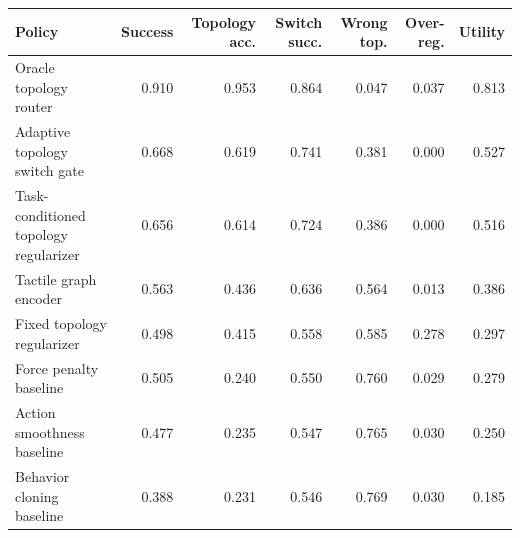 \begin{tabular}{lrrrrrr}
\toprule
Policy & Success & Topology acc. & Switch succ. & Wrong top. & Over-reg. & Utility \\
\midrule
Oracle topology router & 0.910 & 0.953 & 0.864 & 0.047 & 0.037 & 0.813 \\
Adaptive topology switch gate & 0.668 & 0.619 & 0.741 & 0.381 & 0.000 & 0.527 \\
Task-conditioned topology regularizer & 0.656 & 0.614 & 0.724 & 0.386 & 0.000 & 0.516 \\
Tactile graph encoder & 0.563 & 0.436 & 0.636 & 0.564 & 0.013 & 0.386 \\
Fixed topology regularizer & 0.498 & 0.415 & 0.558 & 0.585 & 0.278 & 0.297 \\
Force penalty baseline & 0.505 & 0.240 & 0.550 & 0.760 & 0.029 & 0.279 \\
Action smoothness baseline & 0.477 & 0.235 & 0.547 & 0.765 & 0.030 & 0.250 \\
Behavior cloning baseline & 0.388 & 0.231 & 0.546 & 0.769 & 0.030 & 0.185 \\
\bottomrule
\end{tabular}
